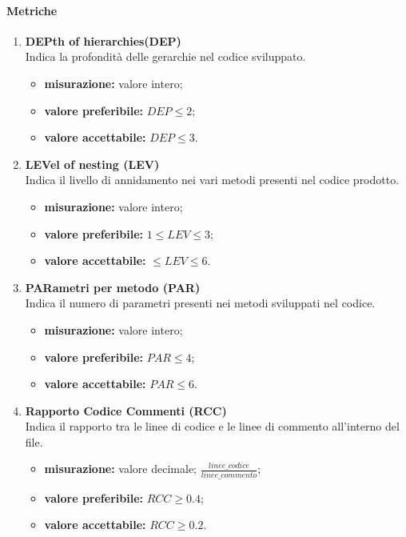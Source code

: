 		\paragraph{Metriche}
		\begin{enumerate}
		\item[]

			\textbf{DEPth of hierarchies(DEP)}\\
			Indica la profondità delle gerarchie nel codice sviluppato.
			\begin{itemize}
				\item \textbf{misurazione:} valore intero;
				\item \textbf{valore preferibile:} $DEP\leq2$;
				\item \textbf{valore accettabile:} $DEP\leq3$.
			\end{itemize}
\pagebreak
		\item[]
			\textbf{LEVel of nesting (LEV)}\\
			Indica il livello di annidamento nei vari metodi presenti nel codice prodotto.
			\begin{itemize}
				\item \textbf{misurazione:} valore intero;
				\item \textbf{valore preferibile:} $1\leq LEV\leq3$;
				\item \textbf{valore accettabile:} $\leq LEV\leq6$.
			\end{itemize}
		\item[]
			\textbf{PARametri per metodo (PAR)}\\
			Indica il numero di parametri presenti nei metodi sviluppati nel codice.
			\begin{itemize}
				\item \textbf{misurazione:} valore intero;
				\item \textbf{valore preferibile:} $PAR\leq 4$;
				\item \textbf{valore accettabile:} $PAR\leq 6$.
			\end{itemize}
		\item[]
			\textbf{Rapporto Codice Commenti (RCC)}\\
			Indica il rapporto tra le linee di codice e le linee di commento all'interno del file.
			\begin{itemize}
				\item \textbf{misurazione:} valore decimale; $\frac{linee\_codice}{linee\_commento}$;
				\item \textbf{valore preferibile:} $RCC\geq 0.4$;
				\item \textbf{valore accettabile:} $RCC\geq 0.2$.
			\end{itemize}
		\end{enumerate}

